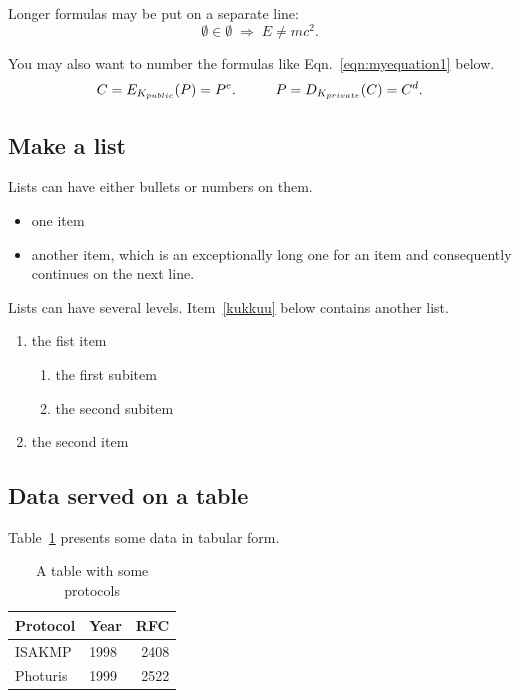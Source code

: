 \documentclass[a4paper,11pt]{article}
\begin{document}
Longer formulas may be put on a separate
line:
\[ \emptyset \in \emptyset \; \Rightarrow \; E \neq mc^2. \]

You may also want to number the formulas like Eqn.~\ref{eqn:myequation1}
below.
\begin{equation}\label{eqn:myequation1}
C = E_{K_{public}}(P) = P^e. \hspace{10mm}   P = D_{K_{private}}(C) = C^d.
\end{equation}


\subsection{Make a list}\label{sec:list}

Lists can have either bullets or numbers on them. 

\begin{itemize}
\item one item
\item another item, which is an exceptionally long one for an item
  and consequently continues on the next line.
\end{itemize}

Lists can have several levels. Item~\ref{kukkuu} below contains
another list.
\begin{enumerate}
\item the fist item \label{kukkuu}
  \begin{enumerate}
  \item the first subitem 
  \item the second subitem
  \end{enumerate}
\item the second item
\end{enumerate}


\subsection{Data served on a table}

Table~\ref{tab:mytable1} presents some data in tabular form. 

\begin{table}[t]
  \begin{center}
    \begin{tabular}{|l|lr|}
    \hline
    Protocol & Year &  RFC \\
    \hline
    ISAKMP   & 1998 & 2408 \\
    Photuris & 1999 & 2522 \\
    \hline
    \end{tabular}
    \caption{A table with some protocols}
    \label{tab:mytable1}
  \end{center}
\end{table}
\end{document}
